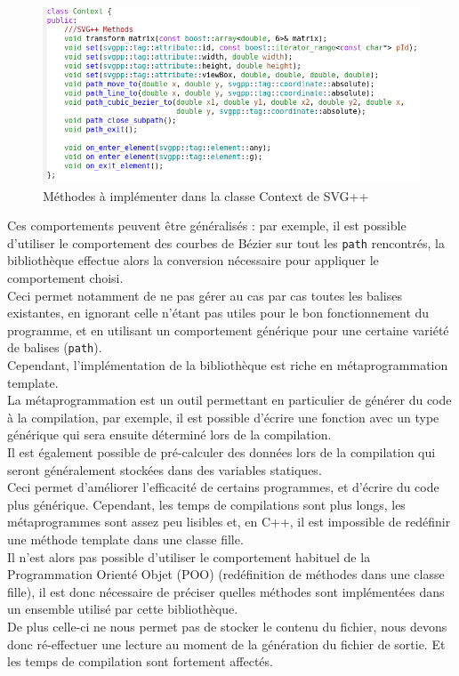 \begin{figure}[H]
\centering
\includegraphics[scale=0.5]{img/SVGPP.png}
\caption{Méthodes à implémenter dans la classe Context de SVG++}
    \label{fig:SVGPP}
\end{figure}

Ces comportements peuvent être généralisés : par exemple, il est possible d'utiliser le comportement des courbes de Bézier sur tout les \texttt{path} rencontrés, la bibliothèque effectue alors la conversion nécessaire pour appliquer le comportement choisi.\\

Ceci permet notamment de ne pas gérer au cas par cas toutes les balises existantes, en ignorant celle n'étant pas utiles pour le bon fonctionnement du programme, et en utilisant un comportement générique pour une certaine variété de balises (\texttt{path}).\\

Cependant, l'implémentation de la bibliothèque est riche en métaprogrammation template.\\
La métaprogrammation est un outil permettant en particulier de générer du code à la compilation, par exemple, il est possible d'écrire une fonction avec un type générique qui sera ensuite déterminé lors de la compilation.\\
Il est également possible de pré-calculer des données lors de la compilation qui seront généralement stockées dans des variables statiques.\\
Ceci permet d'améliorer l'efficacité de certains programmes, et d'écrire du code plus générique. Cependant, les temps de compilations sont plus longs, les métaprogrammes sont assez peu lisibles et, en C++, il est impossible de redéfinir une méthode template dans une classe fille.\\

Il n'est alors pas possible d'utiliser le comportement habituel de la Programmation Orienté Objet (POO) (redéfinition de méthodes dans une classe fille), il est donc nécessaire de préciser quelles méthodes sont implémentées dans un ensemble utilisé par cette bibliothèque.\\
De plus celle-ci ne nous permet pas de stocker le contenu du fichier, nous devons donc ré-effectuer une lecture au moment de la génération du fichier de sortie. Et les temps de compilation sont fortement affectés.\\

